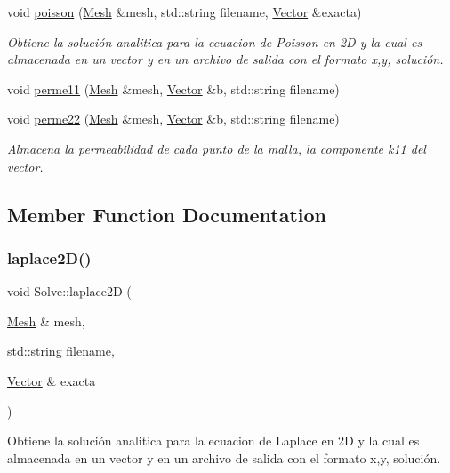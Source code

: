 \begin{DoxyCompactItemize}
void \hyperlink{class_solve_acfbc8ba10f8a9b55011b9687075f0daf}{poisson} (\hyperlink{class_mesh}{Mesh} \&mesh, std\+::string filename, \hyperlink{class_vector}{Vector} \&exacta)
\begin{DoxyCompactList}\small\item\em Obtiene la solución analitica para la ecuacion de Poisson en 2D y la cual es almacenada en un vector y en un archivo de salida con el formato x,y, solución. \end{DoxyCompactList}\item 
void \hyperlink{class_solve_a0f838d919aae1c9123b95b411f3a6828}{perme11} (\hyperlink{class_mesh}{Mesh} \&mesh, \hyperlink{class_vector}{Vector} \&b, std\+::string filename)
\item 
\hypertarget{class_solve_a6f69b3ca8d1a9e572d0e67a60c74bf3e}{}\label{class_solve_a6f69b3ca8d1a9e572d0e67a60c74bf3e} 
void \hyperlink{class_solve_a6f69b3ca8d1a9e572d0e67a60c74bf3e}{perme22} (\hyperlink{class_mesh}{Mesh} \&mesh, \hyperlink{class_vector}{Vector} \&b, std\+::string filename)
\begin{DoxyCompactList}\small\item\em Almacena la permeabilidad de cada punto de la malla, la componente k11 del vector. \end{DoxyCompactList}\end{DoxyCompactItemize}


\subsection{Member Function Documentation}
\hypertarget{class_solve_a9bfcff2b5df48bc1b0fe22ddaa2b8b29}{}\label{class_solve_a9bfcff2b5df48bc1b0fe22ddaa2b8b29} 
\subsubsection{\texorpdfstring{laplace2\+D()}{laplace2D()}}
{\footnotesize\ttfamily void Solve\+::laplace2D (\begin{DoxyParamCaption}\item[{\hyperlink{class_mesh}{Mesh} \&}]{mesh,  }\item[{std\+::string}]{filename,  }\item[{\hyperlink{class_vector}{Vector} \&}]{exacta }\end{DoxyParamCaption})}



Obtiene la solución analitica para la ecuacion de Laplace en 2D y la cual es almacenada en un vector y en un archivo de salida con el formato x,y, solución. 


